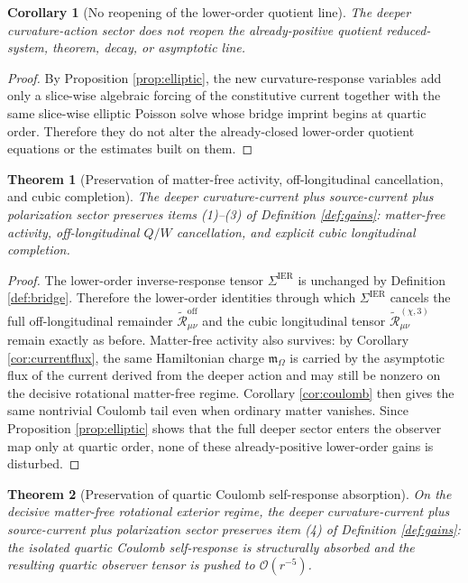 \documentclass[11pt]{article}
\newcommand{\HamChargeOmega}{\mathfrak m_\Omega}
\newcommand{\SigmaIER}{\Sigma^{\mathrm{IER}}}
\newcommand{\ReOff}{\widetilde{\mathcal R}_{\mu\nu}^{\mathrm{off}}}
\newcommand{\ReLongThree}{\widetilde{\mathcal R}_{\mu\nu}^{(\chi,3)}}
\newtheorem{corollary}{Corollary}
\newtheorem{theorem}{Theorem}
\begin{document}
\begin{corollary}[No reopening of the lower-order quotient line]
\label{cor:nopde}
The deeper curvature-action sector does not reopen the already-positive quotient reduced-system, theorem, decay, or asymptotic line.
\end{corollary}

\begin{proof}
By Proposition \ref{prop:elliptic}, the new curvature-response variables add only a slice-wise algebraic forcing of the constitutive current together with the same slice-wise elliptic Poisson solve whose bridge imprint begins at quartic order. Therefore they do not alter the already-closed lower-order quotient equations or the estimates built on them.
\end{proof}

\begin{theorem}[Preservation of matter-free activity, off-longitudinal cancellation, and cubic completion]
\label{thm:firstthree}
The deeper curvature-current plus source-current plus polarization sector preserves items (1)--(3) of Definition \ref{def:gains}: matter-free activity, off-longitudinal \(Q/W\) cancellation, and explicit cubic longitudinal completion.
\end{theorem}

\begin{proof}
The lower-order inverse-response tensor \(\SigmaIER\) is unchanged by Definition \ref{def:bridge}. Therefore the lower-order identities through which \(\SigmaIER\) cancels the full off-longitudinal remainder \(\ReOff\) and the cubic longitudinal tensor \(\ReLongThree\) remain exactly as before. Matter-free activity also survives: by Corollary \ref{cor:currentflux}, the same Hamiltonian charge \(\HamChargeOmega\) is carried by the asymptotic flux of the current derived from the deeper action and may still be nonzero on the decisive rotational matter-free regime. Corollary \ref{cor:coulomb} then gives the same nontrivial Coulomb tail even when ordinary matter vanishes. Since Proposition \ref{prop:elliptic} shows that the full deeper sector enters the observer map only at quartic order, none of these already-positive lower-order gains is disturbed.
\end{proof}

\begin{theorem}[Preservation of quartic Coulomb self-response absorption]
\label{thm:quartic}
On the decisive matter-free rotational exterior regime, the deeper curvature-current plus source-current plus polarization sector preserves item (4) of Definition \ref{def:gains}: the isolated quartic Coulomb self-response is structurally absorbed and the resulting quartic observer tensor is pushed to \(\mathcal O(r^{-5})\).
\end{theorem}
\end{document}
